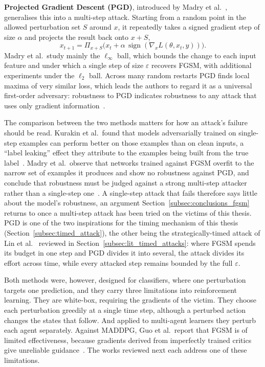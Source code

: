 \textbf{Projected Gradient Descent (PGD)}, introduced by Madry et
al.~\cite{madry2019deeplearningmodelsresistant}, generalises this into a multi-step
attack. Starting from a random point in the allowed perturbation set $S$ around $x$, it
repeatedly takes a signed gradient step of size $\alpha$ and projects the result back
onto $x + S$,
\begin{equation}
x_{t+1} = \Pi_{x+S}\bigl(x_t + \alpha\,\operatorname{sign}(\nabla_x L(\theta, x_t, y))\bigr).
\end{equation}
Madry et al.\ study mainly the $\ell_\infty$ ball, which bounds the change to each input
feature and under which a single step of size $\varepsilon$ recovers FGSM, with
additional experiments under the $\ell_2$ ball. Across many random restarts PGD finds
local maxima of very similar loss, which leads the authors to regard it as a universal
first-order adversary: robustness to PGD indicates robustness to any attack that uses
only gradient information~\cite{madry2019deeplearningmodelsresistant}.

The comparison between the two methods matters for how an attack's failure should be
read. Kurakin et al.\ found that models adversarially trained on single-step examples
can perform better on those examples than on clean inputs, a ``label leaking'' effect
they attribute to the examples being built from the true
label~\cite{kurakin2017adversarialmachinelearningscale,akhtar2021advances}. Madry et al.\
observe that networks trained against FGSM overfit to the narrow set of examples it
produces and show no robustness against PGD, and conclude that robustness must be
judged against a strong multi-step attacker rather than a single-step
one~\cite{madry2019deeplearningmodelsresistant}. A single-step attack that fails
therefore says little about the model's robustness, an argument
Section~\ref{subsec:conclusions_fgsm} returns to once a multi-step attack has been tried
on the victims of this thesis. PGD is one of the two inspirations
for the timing mechanism of this thesis (Section~\ref{subsec:timed_attack}), the other
being the strategically-timed attack of
Lin et al.~\cite{lin2019tacticsadversarialattackdeep} reviewed in
Section~\ref{subsec:lit_timed_attacks}: where FGSM spends its budget in one step and PGD
divides it into several, the attack divides its effort across time, while every attacked
step remains bounded by the full $\varepsilon$.

Both methods were, however, designed for classifiers, where one perturbation targets one
prediction, and they carry three limitations into reinforcement learning. They are
white-box, requiring the gradients of the victim. They choose each perturbation greedily
at a single time step, although a perturbed action changes the states that follow. And
applied to multi-agent learners they perturb each agent separately. Against MADDPG, Guo
et al.\ report that FGSM is of limited effectiveness, because gradients derived from
imperfectly trained critics give unreliable
guidance~\cite{guo2025sajastateactionjointattack,Waghela_2024}. The works reviewed next
each address one of these limitations.

